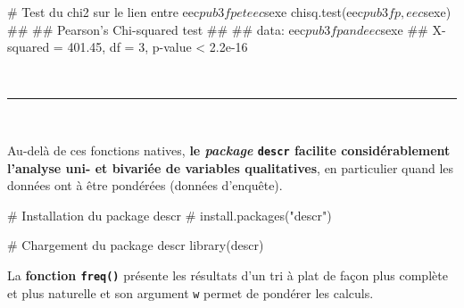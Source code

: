 \documentclass[12pt,twosided, notitlepage]{book}
\newenvironment{Shaded}{}{}
\newcommand{\CommentTok}[1]{\textcolor[rgb]{0.00,0.50,0.00}{#1}}
\newcommand{\KeywordTok}[1]{\textcolor[rgb]{0.00,0.00,1.00}{#1}}
\newcommand{\NormalTok}[1]{#1}
\newcommand{\OperatorTok}[1]{#1}
\renewenvironment{Shaded}{\begin{snugshade}}{\end{snugshade}}
\begin{document}
\begin{Shaded}
\begin{Highlighting}[]
\CommentTok{# Test du chi2 sur le lien entre eec$pub3fp et eec$sexe}
\KeywordTok{chisq.test}\NormalTok{(eec}\OperatorTok{$}\NormalTok{pub3fp, eec}\OperatorTok{$}\NormalTok{sexe)}
\NormalTok{  ## }
\NormalTok{  ##    Pearson's Chi-squared test}
\NormalTok{  ## }
\NormalTok{  ## data:  eec$pub3fp and eec$sexe}
\NormalTok{  ## X-squared = 401.45, df = 3, p-value < 2.2e-16}
\end{Highlighting}
\end{Shaded}

~

\begin{center}\rule{0.5\linewidth}{\linethickness}\end{center}

~

Au-delà de ces fonctions natives, \textbf{le \emph{package}
\texttt{descr} facilite considérablement l'analyse uni- et bivariée de
variables qualitatives}, en particulier quand les données ont à être
pondérées (données d'enquête).

\begin{Shaded}
\begin{Highlighting}[]
\CommentTok{# Installation du package descr}
\CommentTok{# install.packages("descr")}

\CommentTok{# Chargement du package descr}
\KeywordTok{library}\NormalTok{(descr)}
\end{Highlighting}
\end{Shaded}

La \textbf{fonction \texttt{freq()}}
présente les résultats d'un tri à plat de façon plus complète et plus
naturelle et son argument \texttt{w} permet de pondérer les calculs.

\begin{Shaded}
\end{Shaded}
\end{document}
